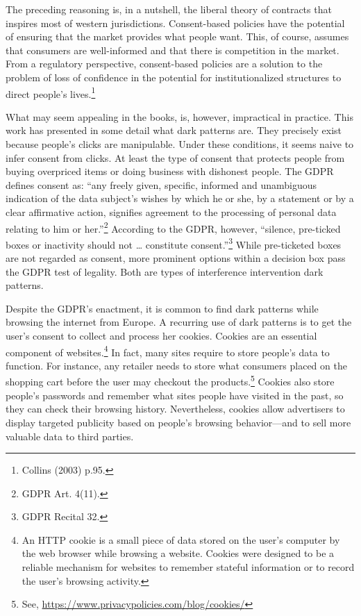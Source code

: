 \documentclass[
  11pt,
  letterpaper,
]{article}
\begin{document}
The preceding reasoning is, in a nutshell, the liberal theory of contracts that inspires most of western jurisdictions. Consent-based policies have the potential of ensuring that the market provides what people want. This, of course, assumes that consumers are well-informed and that there is competition in the market. From a regulatory perspective, consent-based policies are a solution to the problem of loss of confidence in the potential for institutionalized structures to direct people's lives.\footnote{Collins (2003) p.95.}

What may seem appealing in the books, is, however, impractical in practice. This work has presented in some detail what dark patterns are. They precisely exist because people's clicks are manipulable. Under these conditions, it seems naive to infer consent from clicks. At least the type of consent that protects people from buying overpriced items or doing business with dishonest people. The GDPR defines consent as: ``any freely given, specific, informed and unambiguous indication of the data subject's wishes by which he or she, by a statement or by a clear affirmative action, signifies agreement to the processing of personal data relating to him or her.''\footnote{GDPR Art. 4(11).} According to the GDPR, however, ``silence, pre-ticked boxes or inactivity should not \ldots{} constitute consent.''\footnote{GDPR Recital 32.} While pre-ticketed boxes are not regarded as consent, more prominent options within a decision box pass the GDPR test of legality. Both are types of interference intervention dark patterns.

Despite the GDPR's enactment, it is common to find dark patterns while browsing the internet from Europe. A recurring use of dark patterns is to get the user's consent to collect and process her cookies. Cookies are an essential component of websites.\footnote{An HTTP cookie is a small piece of data stored on the user's computer by the web browser while browsing a website. Cookies were designed to be a reliable mechanism for websites to remember stateful information or to record the user's browsing activity.} In fact, many sites require to store people's data to function. For instance, any retailer needs to store what consumers placed on the shopping cart before the user may checkout the products.\footnote{See, \url{https://www.privacypolicies.com/blog/cookies/}} Cookies also store people's passwords and remember what sites people have visited in the past, so they can check their browsing history. Nevertheless, cookies allow advertisers to display targeted publicity based on people's browsing behavior---and to sell more valuable data to third parties.
\end{document}
